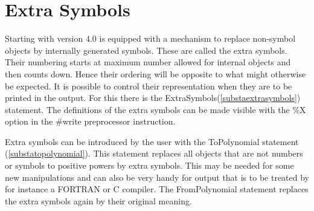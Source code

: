 \section{Extra Symbols}

\label{sect-extrasymbols}
Starting with version 4.0 \FORM is equipped with a mechanism to replace 
non-symbol objects by internally generated symbols. These are called the 
extra symbols. Their numbering starts at maximum number allowed for 
internal objects and then counts down. Hence their ordering will be 
opposite to what might otherwise be expected. It is possible to control 
their representation when they are to be printed in the output. For this 
there is the ExtraSymbols(\ref{substaextrasymbols}) statement. The 
definitions of the extra symbols can be made visible with the \%X option in 
the \#write preprocessor instruction.

Extra symbols can be introduced by the user with the ToPolynomial statement 
(\ref{substatopolynomial}). This statement replaces all objects that are 
not numbers or symbols to positive powers by extra symbols. This may be 
needed for some new manipulations and can also be very handy for output 
that is to be treated by for instance a FORTRAN or C compiler. The 
FromPolynomial statement replaces the extra symbols again by their original 
meaning.

